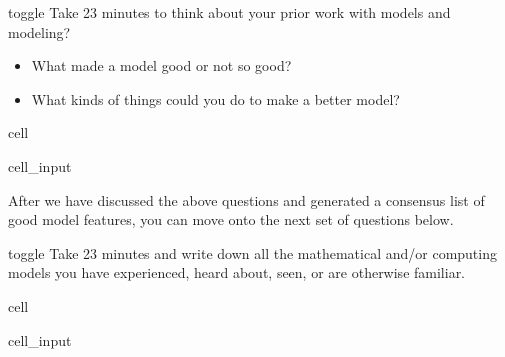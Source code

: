 \documentclass[letterpaper,10pt,english]{jupyterBook}
\begin{document}
\begin{sphinxuseclass}{toggle}
\sphinxAtStartPar
Take 2\sphinxhyphen{}3 minutes to think about your prior work with models and modeling?
\begin{itemize}
\item {} 
\sphinxAtStartPar
What made a model good or not so good?

\item {} 
\sphinxAtStartPar
What kinds of things could you do to make a better model?

\end{itemize}

\end{sphinxuseclass}
\begin{sphinxuseclass}{cell}\begin{sphinxVerbatimInput}

\begin{sphinxuseclass}{cell_input}
\begin{sphinxVerbatim}[commandchars=\\\{\}]

\end{sphinxVerbatim}

\end{sphinxuseclass}\end{sphinxVerbatimInput}

\end{sphinxuseclass}
\sphinxAtStartPar
After we have discussed the above questions and generated a consensus list of good model features, you can move onto the next set of questions below.

\begin{sphinxuseclass}{toggle}
\sphinxAtStartPar
Take 2\sphinxhyphen{}3 minutes and write down all the mathematical and/or computing models you have experienced, heard about, seen, or are otherwise familiar.

\end{sphinxuseclass}
\begin{sphinxuseclass}{cell}\begin{sphinxVerbatimInput}

\begin{sphinxuseclass}{cell_input}
\begin{sphinxVerbatim}[commandchars=\\\{\}]

\end{sphinxVerbatim}

\end{sphinxuseclass}\end{sphinxVerbatimInput}

\end{sphinxuseclass}
\sphinxstepscope
\end{document}
